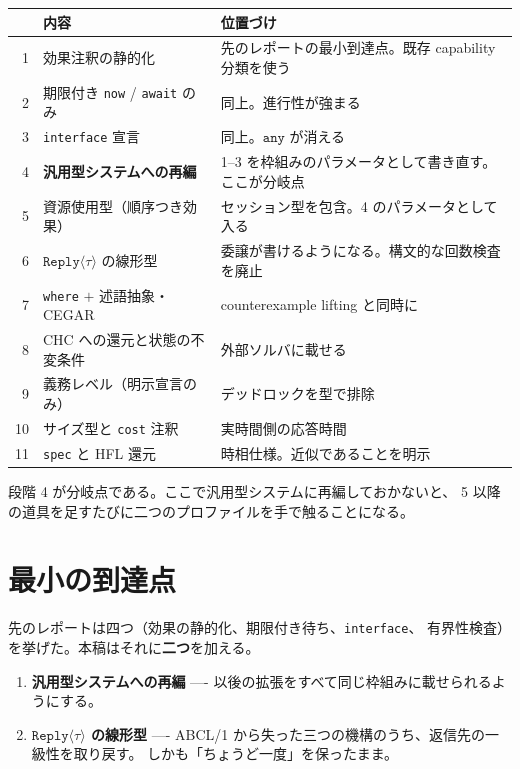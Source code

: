 \documentclass[11pt,a4paper]{ltjsarticle}
\theoremstyle{remark}
\newcommand{\ty}[1]{\ensuremath{\mathtt{#1}}}
\begin{document}
\begin{center}
\small
\begin{tabular}{@{}rlp{6.6cm}@{}}
\toprule
 & 内容 & 位置づけ \\
\midrule
1 & 効果注釈の静的化 & 先のレポートの最小到達点。既存 capability 分類を使う \\
2 & 期限付き \texttt{now} / \texttt{await} のみ & 同上。進行性が強まる \\
3 & \texttt{interface} 宣言 & 同上。\ty{any} が消える \\
4 & \textbf{汎用型システムへの再編} &
  1--3 を枠組みのパラメータとして書き直す。ここが分岐点 \\
5 & 資源使用型（順序つき効果）& セッション型を包含。4 のパラメータとして入る \\
6 & \ty{Reply}$\langle\tau\rangle$ の線形型 &
  委譲が書けるようになる。構文的な回数検査を廃止 \\
7 & \texttt{where} $+$ 述語抽象・CEGAR &
  counterexample lifting と同時に \\
8 & CHC への還元と状態の不変条件 & 外部ソルバに載せる \\
9 & 義務レベル（明示宣言のみ）& デッドロックを型で排除 \\
10 & サイズ型と \texttt{cost} 注釈 & 実時間側の応答時間 \\
11 & \texttt{spec} と HFL 還元 & 時相仕様。近似であることを明示 \\
\bottomrule
\end{tabular}
\end{center}

段階 4 が分岐点である。ここで汎用型システムに再編しておかないと、
5 以降の道具を足すたびに二つのプロファイルを手で触ることになる。

\section{最小の到達点}

先のレポートは四つ（効果の静的化、期限付き待ち、\texttt{interface}、
有界性検査）を挙げた。本稿はそれに\textbf{二つ}を加える。

\begin{enumerate}
\item[(5)] \textbf{汎用型システムへの再編} ----
  以後の拡張をすべて同じ枠組みに載せられるようにする。
\item[(6)] \textbf{\ty{Reply}$\langle\tau\rangle$ の線形型} ----
  ABCL/1 から失った三つの機構のうち、返信先の一級性を取り戻す。
  しかも「ちょうど一度」を保ったまま。
\end{enumerate}
\end{document}
